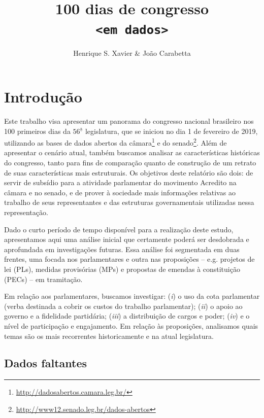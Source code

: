 \documentclass[12pt,a4paper]{article}
\author{Henrique S. Xavier \& João Carabetta}
\title{\secColor\Huge\sffamily\bfseries 100 dias de congresso\\\texttt{<em dados>}}
\affil{Gabinete compartilhado\\Movimento Acredito no Congresso Nacional}
\newcommand{\footurl}[1]{{\scriptsize\url{#1}}}
\begin{document}
\thispagestyle{empty}
\maketitle
\pagebreak

\thispagestyle{empty}
\tableofcontents
\pagebreak

\thispagestyle{plain}

\section{Introdução}
\label{sec:intro}

Este trabalho visa apresentar um panorama do congresso nacional brasileiro nos 100 primeiros dias da $56^{\mathrm{\underline{a}}}$ legislatura, que
se iniciou no dia 1 de fevereiro de 2019, utilizando as bases de dados abertos da câmara\footnote{\footurl{http://dadosabertos.camara.leg.br/}}
e do senado\footnote{\footurl{http://www12.senado.leg.br/dados-abertos}}. Além de apresentar o cenário atual, também buscamos analisar
as características históricas do congresso, tanto para fins de comparação quanto de construção de um retrato de suas características
mais estruturais. Os objetivos deste relatório são dois: de servir de subsídio para a atividade parlamentar do movimento Acredito na
câmara e no senado, e de prover à sociedade mais informações relativas ao trabalho de seus representantes e das estruturas governamentais
utilizadas nessa representação.

Dado o curto período de tempo disponível para a realização deste estudo, apresentamos aqui uma análise inicial que
certamente poderá ser desdobrada e aprofundada em investigações futuras. Essa análise foi segmentada em duas frentes,
uma focada nos parlamentares e outra nas proposições -- e.g. projetos de lei (PLs), medidas provisórias (MPs) e propostas
de emendas à constituição (PECs) -- em tramitação.

Em relação aos parlamentares, buscamos investigar:
(\emph{i}) o uso da cota parlamentar (verba destinada a cobrir os custos do trabalho parlamentar);
(\emph{ii}) o apoio ao governo e a fidelidade partidária;
(\emph{iii}) a distribuição de cargos e poder;
(\emph{iv}) e o nível de participação e engajamento.
Em relação às proposições, analisamos quais temas são os mais recorrentes historicamente e na atual legislatura.


\subsection{Dados faltantes}
\end{document}
